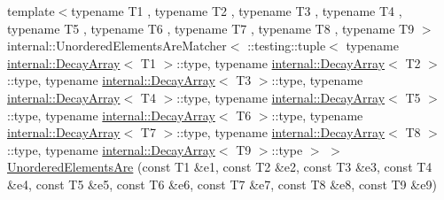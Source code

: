 \begin{DoxyCompactItemize}
\item 
{\footnotesize template$<$typename T1 , typename T2 , typename T3 , typename T4 , typename T5 , typename T6 , typename T7 , typename T8 , typename T9 $>$ }\\internal\+::\+Unordered\+Elements\+Are\+Matcher$<$ \+::testing\+::tuple$<$ typename \mbox{\hyperlink{structtesting_1_1internal_1_1_decay_array}{internal\+::\+Decay\+Array}}$<$ T1 $>$\+::type, typename \mbox{\hyperlink{structtesting_1_1internal_1_1_decay_array}{internal\+::\+Decay\+Array}}$<$ T2 $>$\+::type, typename \mbox{\hyperlink{structtesting_1_1internal_1_1_decay_array}{internal\+::\+Decay\+Array}}$<$ T3 $>$\+::type, typename \mbox{\hyperlink{structtesting_1_1internal_1_1_decay_array}{internal\+::\+Decay\+Array}}$<$ T4 $>$\+::type, typename \mbox{\hyperlink{structtesting_1_1internal_1_1_decay_array}{internal\+::\+Decay\+Array}}$<$ T5 $>$\+::type, typename \mbox{\hyperlink{structtesting_1_1internal_1_1_decay_array}{internal\+::\+Decay\+Array}}$<$ T6 $>$\+::type, typename \mbox{\hyperlink{structtesting_1_1internal_1_1_decay_array}{internal\+::\+Decay\+Array}}$<$ T7 $>$\+::type, typename \mbox{\hyperlink{structtesting_1_1internal_1_1_decay_array}{internal\+::\+Decay\+Array}}$<$ T8 $>$\+::type, typename \mbox{\hyperlink{structtesting_1_1internal_1_1_decay_array}{internal\+::\+Decay\+Array}}$<$ T9 $>$\+::type $>$ $>$ \mbox{\hyperlink{namespacetesting_a2e03e363e193ef512bf9fa964c484375}{Unordered\+Elements\+Are}} (const T1 \&e1, const T2 \&e2, const T3 \&e3, const T4 \&e4, const T5 \&e5, const T6 \&e6, const T7 \&e7, const T8 \&e8, const T9 \&e9)
\item 

\end{DoxyCompactItemize}

